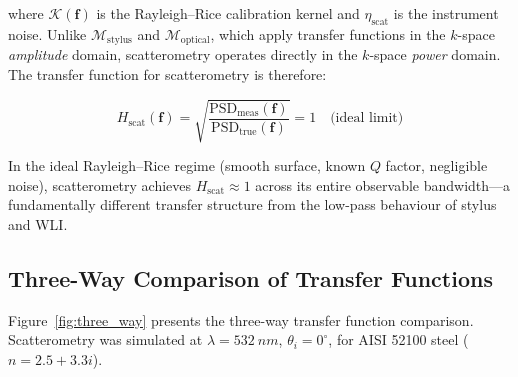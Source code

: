 \documentclass[review,12pt]{elsarticle}
\begin{document}
where $\mathcal{K}(\mathbf{f})$ is the Rayleigh--Rice calibration kernel and $\eta_\mathrm{scat}$ is the instrument noise. Unlike $\mathcal{M}_\mathrm{stylus}$ and $\mathcal{M}_\mathrm{optical}$, which apply transfer functions in the $k$-space \textit{amplitude} domain, scatterometry operates directly in the $k$-space \textit{power} domain. The transfer function for scatterometry is therefore:

\begin{equation}
    H_\mathrm{scat}(\mathbf{f}) = \sqrt{\frac{\mathrm{PSD}_\mathrm{meas}(\mathbf{f})}{\mathrm{PSD}_\mathrm{true}(\mathbf{f})}} = 1 \quad \text{(ideal limit)}
\end{equation}

In the ideal Rayleigh--Rice regime (smooth surface, known $Q$ factor, negligible noise), scatterometry achieves $H_\mathrm{scat} \approx 1$ across its entire observable bandwidth---a fundamentally different transfer structure from the low-pass behaviour of stylus and WLI.

\subsection{Three-Way Comparison of Transfer Functions}

Figure~\ref{fig:three_way} presents the three-way transfer function comparison. Scatterometry was simulated at $\lambda = \SI{532}{nm}$, $\theta_i = 0^\circ$, for AISI 52100 steel ($n = 2.5 + 3.3i$).
\end{document}
